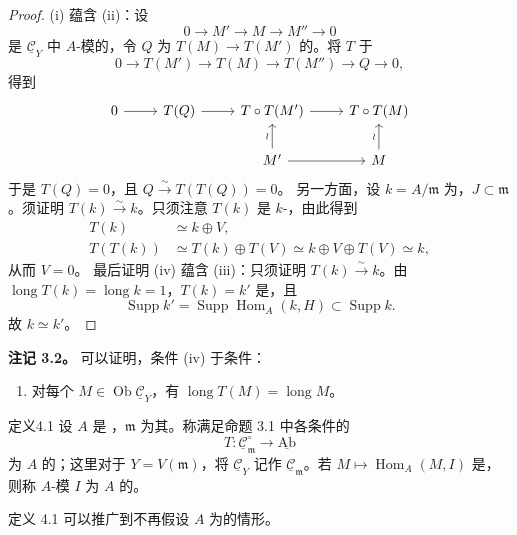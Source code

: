 \begin{proof}
(i) 蕴含 (ii)：设
\[0\longrightarrow M'\longrightarrow M\longrightarrow M''\longrightarrow0\]
是 $\underline{\mathcal C}_Y$ 中 $A$-模的，令 $Q$ 为 $T(M)\to T(M')$ 的。将 $T$ 于
\[0\longrightarrow T(M')\longrightarrow T(M)\longrightarrow T(M'')\longrightarrow Q\longrightarrow0,\]
得到
\[\begin{tikzcd}
0\arrow[r]&T(Q)\arrow[r]&T\circ T(M')\arrow[r]&T\circ T(M)\\
&&M'\arrow[u,"\wr"]\arrow[r]&M\arrow[u,"\wr"]
\end{tikzcd}\]
于是 $T(Q)=0$，且 $Q\xrightarrow{\sim}T(T(Q))=0$。
另一方面，设 $k=A/\mathfrak m$ 为，$J\subset\mathfrak m$。须证明 $T(k)\xrightarrow{\sim}k$。只须注意 $T(k)$ 是 $k$-，由此得到
\[\begin{aligned}
T(k)&\simeq k\oplus V,\\
T(T(k))&\simeq T(k)\oplus T(V)\simeq k\oplus V\oplus T(V)\simeq k,
\end{aligned}\]
从而 $V=0$。
最后证明 (iv) 蕴含 (iii)：只须证明 $T(k)\xrightarrow{\sim}k$。由 $\operatorname{long}T(k)=\operatorname{long}k=1$，$T(k)=k'$ 是，且
\[\operatorname{Supp}k'=\operatorname{Supp}\operatorname{Hom}_A(k,H)\subset\operatorname{Supp}k.\]
故 $k\simeq k'$。
\end{proof}
\textbf{注记 3.2。} 可以证明，条件 (iv) 于条件：
\begin{enumerate}\item[(iv)$'$] 对每个 $M\in\operatorname{Ob}\underline{\mathcal C}_Y$，有 $\operatorname{long}T(M)=\operatorname{long}M$。\end{enumerate}
\begin{SGAresult}{定义}{4.1}
设 $A$ 是 ，$\mathfrak m$ 为其。称满足命题 3.1 中各条件的
\[T:\underline{\mathcal C}_{\mathfrak m}^{\circ}\longrightarrow\underline{\mathrm{Ab}}\]
为 $A$ 的；这里对于 $Y=V(\mathfrak m)$，将 $\underline{\mathcal C}_Y$ 记作 $\underline{\mathcal C}_{\mathfrak m}$。若 $M\mapsto\operatorname{Hom}_A(M,I)$ 是，则称 $A$-模 $I$ 为 $A$ 的。
\end{SGAresult}
定义 4.1 可以推广到不再假设 $A$ 为的情形。
